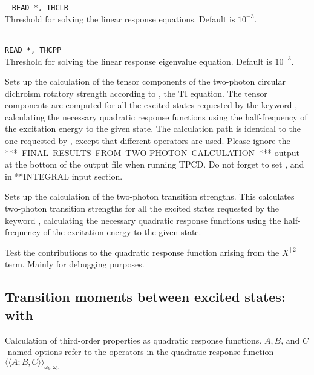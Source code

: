 \begin{description}
\item{}\verb| |\newline
\verb|READ *, THCLR|\\
Threshold for solving the linear response equations.
Default is $10^{-3}$.

\item{}\\
\verb|READ *, THCPP|\\
Threshold for solving the linear response
eigenvalue equation. Default is $10^{-3}$.

\item{}
Sets up the calculation of the tensor components of the two-photon circular dichroism rotatory 
strength according to \cite{bjarhacpl414}, the TI equation.
The tensor components are computed for all the excited states
requested by the keyword , calculating the necessary
quadratic response functions using the half-frequency of the
excitation energy to the given state. The calculation path is identical to the
one requested by , except that different operators are used.
Please ignore the \mbox{***~FINAL~RESULTS~FROM~TWO-PHOTON~CALCULATION~***} output
at the bottom of the output file when running TPCD.
Do not forget to set ,  and  in **INTEGRAL
input section.


\item{}
Sets up the calculation of the two-photon transition strengths. This
calculates two-photon transition strengths for all the excited states
requested by the keyword , calculating the necessary
quadratic response functions using the half-frequency of the
excitation energy to the given state.

\item{}
Test the contributions to the quadratic response function arising from
the $X^{\left[2\right]}$ term. Mainly for debugging purposes.
\end{description}


\subsection{Transition moments between excited states:  with }

Calculation of third-order properties as quadratic response
functions.
$A,B$, and $C$-named options refer to the operators in the quadratic
response function 
$\langle\!\langle A;B,C \rangle\!\rangle_{\omega_b,\omega_c}$
\cite{ovhapjhjajthjojcp97,hhhjajpjjojcp97,haovhkpjthjcp98}

